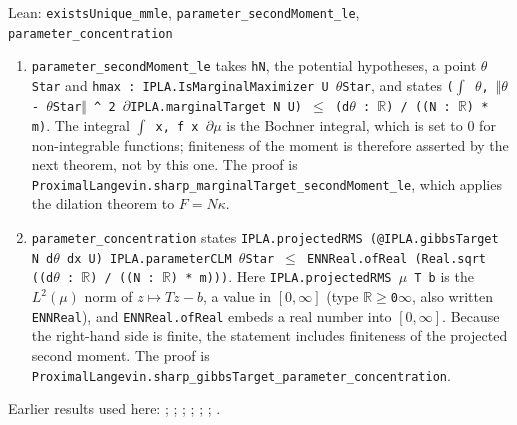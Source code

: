 \documentclass[11pt,a4paper]{report}
\begin{document}
\begin{leanbox}{Lean: \texttt{existsUnique\_\allowbreak{}mmle}, \texttt{parameter\_\allowbreak{}secondMoment\_\allowbreak{}le}, \texttt{parameter\_\allowbreak{}concentration}}
\begin{enumerate}
\item \texttt{parameter\_\allowbreak{}second\allowbreak{}Moment\_\allowbreak{}le} takes \texttt{h\allowbreak{}N}, the potential hypotheses, a point \texttt{\ensuremath{\theta}\allowbreak{}Star} and \texttt{hmax : IPLA.\allowbreak{}Is\allowbreak{}Marginal\allowbreak{}Maximizer U \ensuremath{\theta}\allowbreak{}Star}, and states \texttt{(\ensuremath{\int} \ensuremath{\theta}, \ensuremath{\Vert}\ensuremath{\theta} -\allowbreak{} \ensuremath{\theta}\allowbreak{}Star\ensuremath{\Vert} \textasciicircum{} 2 \ensuremath{\partial}IPLA.\allowbreak{}marginal\allowbreak{}Target N U) \ensuremath{\le} (d\ensuremath{\theta} : \ensuremath{\mathbb R}) /\allowbreak{} ((N : \ensuremath{\mathbb R}) * m)}. The integral \texttt{\ensuremath{\int} x, f x \ensuremath{\partial}\ensuremath{\mu}} is the Bochner integral, which is set to \(0\) for non-integrable functions; finiteness of the moment is therefore asserted by the next theorem, not by this one. The proof is \texttt{Proximal\allowbreak{}Langevin.\allowbreak{}sharp\_\allowbreak{}marginal\allowbreak{}Target\_\allowbreak{}second\allowbreak{}Moment\_\allowbreak{}le}, which applies the dilation theorem to \(F=N\kappa\).

\item \texttt{parameter\_\allowbreak{}concentration} states \texttt{IPLA.\allowbreak{}projected\allowbreak{}RMS (@IPLA.\allowbreak{}gibbs\allowbreak{}Target N d\ensuremath{\theta} dx U) IPLA.\allowbreak{}parameter\allowbreak{}CLM \ensuremath{\theta}\allowbreak{}Star \ensuremath{\le} ENNReal.\allowbreak{}of\allowbreak{}Real (Real.\allowbreak{}sqrt ((d\ensuremath{\theta} : \ensuremath{\mathbb R}) /\allowbreak{} ((N : \ensuremath{\mathbb R}) * m)))}. Here \texttt{IPLA.\allowbreak{}projected\allowbreak{}RMS \ensuremath{\mu} T b} is the \(L^2(\mu)\) norm of \(z\mapsto Tz-b\), a value in \([0,\infty]\) (type \texttt{\ensuremath{\mathbb R}\ensuremath{\ge}0\ensuremath{\infty}}, also written \texttt{ENNReal}), and \texttt{ENNReal.\allowbreak{}of\allowbreak{}Real} embeds a real number into \([0,\infty]\). Because the right-hand side is finite, the statement includes finiteness of the projected second moment. The proof is \texttt{Proximal\allowbreak{}Langevin.\allowbreak{}sharp\_\allowbreak{}gibbs\allowbreak{}Target\_\allowbreak{}parameter\_\allowbreak{}concentration}.

\end{enumerate}
\end{leanbox}


Earlier results used here: \cite[Section~3.1.1]{LangevinLean2026IPLA}; \cite[Section~3.1.6]{LangevinLean2026IPLA}; \cite[Section~3.12.4]{LangevinLean2026IPLA}; \cite[Section~3.3.1]{LangevinLean2026IPLA}; \cite[Section~3.3.2]{LangevinLean2026IPLA}; \cite[Section~3.9.9]{LangevinLean2026IPLA}; \cite[Section~3.6.1]{LangevinLean2026Proximal}.
\end{document}
